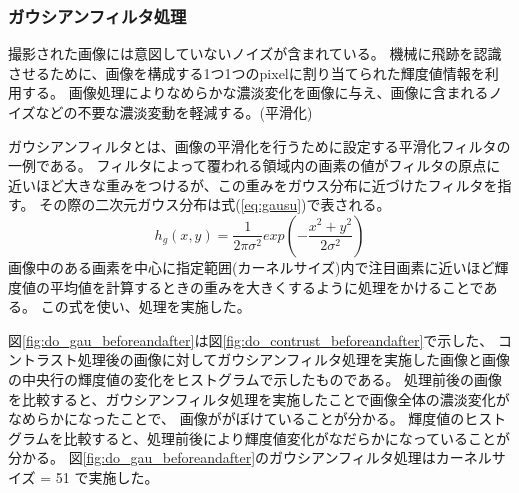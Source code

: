 \documentclass[12pt,a4paper]{jarticle}
\begin{document}
\subsubsection{ガウシアンフィルタ処理}
撮影された画像には意図していないノイズが含まれている。
機械に飛跡を認識させるために、画像を構成する1つ1つのpixelに割り当てられた輝度値情報を利用する。
画像処理によりなめらかな濃淡変化を画像に与え、画像に含まれるノイズなどの不要な濃淡変動を軽減する。(平滑化)
\par
ガウシアンフィルタとは、画像の平滑化を行うために設定する平滑化フィルタの一例である。
フィルタによって覆われる領域内の画素の値がフィルタの原点に近いほど大きな重みをつけるが、この重みをガウス分布に近づけたフィルタを指す。
その際の二次元ガウス分布は式(\ref{eq:gausu})で表される。
\begin{equation}
  h_g(x,y) = \frac{1}{2\pi\sigma^2}exp(-\frac{x^2 + y^2}{2\sigma^2})
\label{eq:gausu}
\end{equation}
画像中のある画素を中心に指定範囲(カーネルサイズ)内で注目画素に近いほど輝度値の平均値を計算するときの重みを大きくするように処理をかけることである。
この式を使い、処理を実施した。
\par
図\ref{fig:do_gau_beforeandafter}は図\ref{fig:do_contrust_beforeandafter}で示した、
コントラスト処理後の画像に対してガウシアンフィルタ処理を実施した画像と画像の中央行の輝度値の変化をヒストグラムで示したものである。
処理前後の画像を比較すると、ガウシアンフィルタ処理を実施したことで画像全体の濃淡変化がなめらかになったことで、
画像ががぼけていることが分かる。
輝度値のヒストグラムを比較すると、処理前後により輝度値変化がなだらかになっていることが分かる。
図\ref{fig:do_gau_beforeandafter}のガウシアンフィルタ処理はカーネルサイズ = 51 で実施した。
\end{document}
